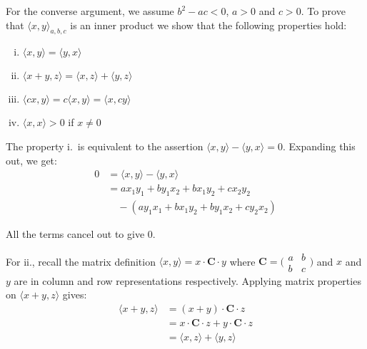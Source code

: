 \documentclass[letterpaper,10pt]{article}
\begin{document}
\begin{enumerate}
\begin{enumerate}[a)]


		For the converse argument, we assume $b^2 - ac < 0$, $a > 0$ and $c > 0$. To prove that $\langle x , y \rangle _{a,b,c}$ is an inner product we show that the following properties hold:

		\begin{enumerate}[i.]
			\item $\langle x, y \rangle = \langle y, x \rangle$
			\item $\langle x + y, z \rangle = \langle x, z \rangle + \langle y, z \rangle$
			\item $\langle cx, y \rangle = c\langle x, y \rangle = \langle x, cy \rangle$
			\item $\langle x, x \rangle > 0$ if $x \neq 0$
		\end{enumerate}

		The property i.\ is equivalent to the assertion $\langle x, y \rangle - \langle y, x \rangle = 0$. Expanding this out, we get:
		\begin{align*}
			0 &= \langle x, y \rangle - \langle y, x \rangle \\
			&= a x_{1} y_{1} + by_{1} x_{2} + bx_{1} y_{2} + c x_{2} y_{2} \\
			& \quad - (a y_{1} x_{1} + bx_{1} y_{2} + by_{1} x_{2} + c y_{2} x_{2})
		\end{align*}

		All the terms cancel out to give 0.

		For ii., recall the matrix definition $\langle x, y \rangle = x \cdot \mathbf{C} \cdot y$
		where $ \mathbf{C} = \bigl(\begin{smallmatrix}
			a&b\\ b&c
		\end{smallmatrix} \bigr)$ and $x$ and $y$ are in column and row representations respectively. Applying matrix properties on $\langle x + y, z \rangle$ gives:
		\begin{align*}
			\langle x + y, z \rangle &= (x+y) \cdot \mathbf{C} \cdot z \\
			 &= x \cdot \mathbf{C} \cdot z + y \cdot \mathbf{C} \cdot z \\
			 &= \langle x, z \rangle + \langle y, z \rangle
		\end{align*}


\end{enumerate}
\end{enumerate}
\end{document}
